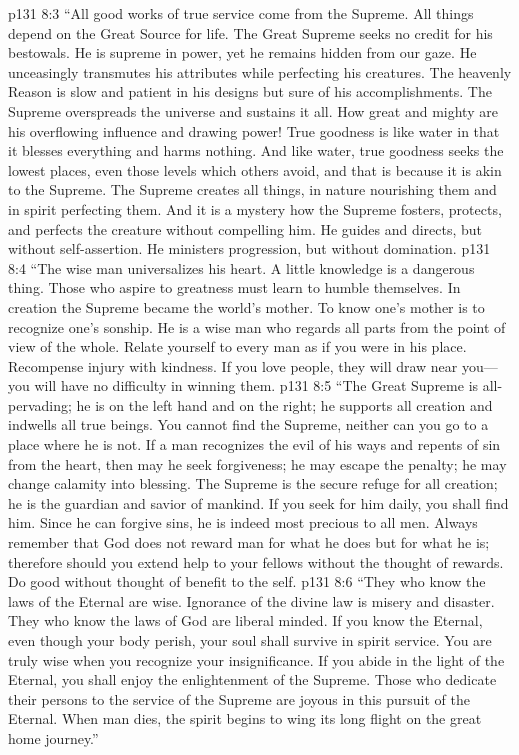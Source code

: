 \vs p131 8:3 “All good works of true service come from the Supreme. All things depend on the Great Source for life. The Great Supreme seeks no credit for his bestowals. He is supreme in power, yet he remains hidden from our gaze. He unceasingly transmutes his attributes while perfecting his creatures. The heavenly Reason is slow and patient in his designs but sure of his accomplishments. The Supreme overspreads the universe and sustains it all. How great and mighty are his overflowing influence and drawing power! True goodness is like water in that it blesses everything and harms nothing. And like water, true goodness seeks the lowest places, even those levels which others avoid, and that is because it is akin to the Supreme. The Supreme creates all things, in nature nourishing them and in spirit perfecting them. And it is a mystery how the Supreme fosters, protects, and perfects the creature without compelling him. He guides and directs, but without self\hyp{}assertion. He ministers progression, but without domination.
\vs p131 8:4 “The wise man universalizes his heart. A little knowledge is a dangerous thing. Those who aspire to greatness must learn to humble themselves. In creation the Supreme became the world’s mother. To know one’s mother is to recognize one’s sonship. He is a wise man who regards all parts from the point of view of the whole. Relate yourself to every man as if you were in his place. Recompense injury with kindness. If you love people, they will draw near you---you will have no difficulty in winning them.
\vs p131 8:5 “The Great Supreme is all\hyp{}pervading; he is on the left hand and on the right; he supports all creation and indwells all true beings. You cannot find the Supreme, neither can you go to a place where he is not. If a man recognizes the evil of his ways and repents of sin from the heart, then may he seek forgiveness; he may escape the penalty; he may change calamity into blessing. The Supreme is the secure refuge for all creation; he is the guardian and savior of mankind. If you seek for him daily, you shall find him. Since he can forgive sins, he is indeed most precious to all men. Always remember that God does not reward man for what he does but for what he is; therefore should you extend help to your fellows without the thought of rewards. Do good without thought of benefit to the self.
\vs p131 8:6 “They who know the laws of the Eternal are wise. Ignorance of the divine law is misery and disaster. They who know the laws of God are liberal minded. If you know the Eternal, even though your body perish, your soul shall survive in spirit service. You are truly wise when you recognize your insignificance. If you abide in the light of the Eternal, you shall enjoy the enlightenment of the Supreme. Those who dedicate their persons to the service of the Supreme are joyous in this pursuit of the Eternal. When man dies, the spirit begins to wing its long flight on the great home journey.”
